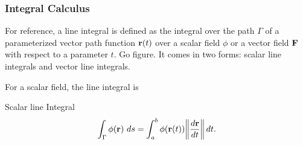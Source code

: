 	\subsubsection{Integral Calculus}
			
			

			For reference, a line integral is defined as the integral over the path $\Gamma$ of a parameterized vector path function $\vb r(t)$ over a scalar field $\phi$ or a vector field $\vb F$ with respect to a parameter $t$. Go figure. It comes in two forms: scalar line integrals and vector line integrals.

			For a scalar field, the line integral is
			\begin{definition}{Scalar line Integral}
				\begin{equation}
					\int_\Gamma \phi(\vb r)\,\dd{s}
					=
					\int_{a}^{b}
					\phi(\vb r(t))
					\norm{\dv{\vb r}{t}}\,dt.
				\end{equation}
			\end{definition}

